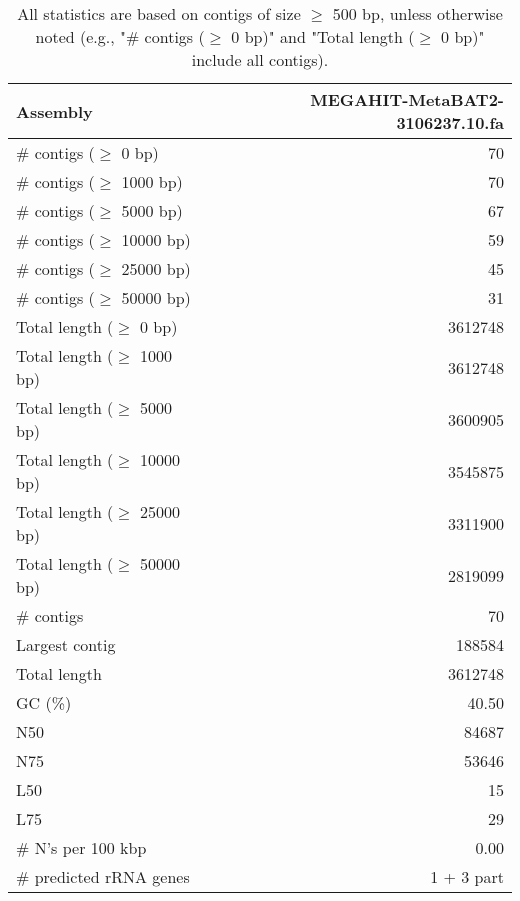 \documentclass[12pt,a4paper]{article}
\begin{document}
\begin{table}[ht]
\begin{center}
\caption{All statistics are based on contigs of size $\geq$ 500 bp, unless otherwise noted (e.g., "\# contigs ($\geq$ 0 bp)" and "Total length ($\geq$ 0 bp)" include all contigs).}
\begin{tabular}{|l*{1}{|r}|}
\hline
Assembly & MEGAHIT-MetaBAT2-3106237.10.fa \\ \hline
\# contigs ($\geq$ 0 bp) & 70 \\ \hline
\# contigs ($\geq$ 1000 bp) & 70 \\ \hline
\# contigs ($\geq$ 5000 bp) & 67 \\ \hline
\# contigs ($\geq$ 10000 bp) & 59 \\ \hline
\# contigs ($\geq$ 25000 bp) & 45 \\ \hline
\# contigs ($\geq$ 50000 bp) & 31 \\ \hline
Total length ($\geq$ 0 bp) & 3612748 \\ \hline
Total length ($\geq$ 1000 bp) & 3612748 \\ \hline
Total length ($\geq$ 5000 bp) & 3600905 \\ \hline
Total length ($\geq$ 10000 bp) & 3545875 \\ \hline
Total length ($\geq$ 25000 bp) & 3311900 \\ \hline
Total length ($\geq$ 50000 bp) & 2819099 \\ \hline
\# contigs & 70 \\ \hline
Largest contig & 188584 \\ \hline
Total length & 3612748 \\ \hline
GC (\%) & 40.50 \\ \hline
N50 & 84687 \\ \hline
N75 & 53646 \\ \hline
L50 & 15 \\ \hline
L75 & 29 \\ \hline
\# N's per 100 kbp & 0.00 \\ \hline
\# predicted rRNA genes & 1 + 3 part \\ \hline
\end{tabular}
\end{center}
\end{table}
\end{document}
